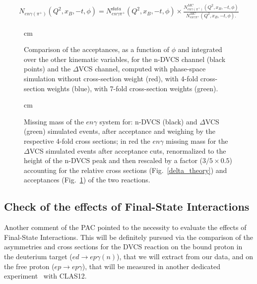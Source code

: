 \documentclass[12pt,oneside]{article}
\begin{document}
{\begin{eqnarray}\label{background_formula}
N_{en\gamma(\pi^+)}(Q^2,x_B,-t,\phi)=N^{data}_{en\gamma\pi^+}(Q^2,x_B,-t,\phi)\times \frac{N^{MC}_{en\gamma(\pi^+)}(Q^2,x_B,-t,\phi)}{N^{MC}_{en\gamma\pi^+}(Q^2,x_B,-t,\phi).}
\end{eqnarray}

\begin{figure}[h]  
\begin{center}
 cm
\caption{Comparison of the acceptances, as a function of $\phi$ and integrated over the other kinematic variables, for the n-DVCS channel (black points) and the $\Delta$VCS channel, computed with phase-space simulation without cross-section weight (red), with 4-fold cross-section weights (blue), with 7-fold cross-section weights (green).}
\label{acc_phi_delta}
\end{center}
\end{figure}

\begin{figure}[h]  
\begin{center}
 cm
\caption{Missing mass of the $en\gamma$ system for: n-DVCS (black) and $\Delta$VCS (green) simulated events, after acceptance and weighing by the respective 4-fold cross sections; in red the $en\gamma$ missing mass for the $\Delta$VCS simulated events after acceptance cuts, renormalized to the height of the n-DVCS peak and then rescaled by a factor ($3/5\times 0.5$) accounting for the relative cross sections (Fig.~\ref{delta_theory}) and acceptances (Fig.~\ref{acc_phi_delta}) of the two reactions.}
\label{delta_mm}
\end{center}
\end{figure}

\subsection{Check of the effects of Final-State Interactions}
Another comment of the PAC pointed to the necessity to evaluate the effects of Final-State Interactions. This will be definitely pursued via the comparison of the asymmetries and cross sections for the DVCS reaction on the bound proton in the deuterium target ($ed\to ep\gamma(n)$), that we will extract from our data, and on the free proton ($ep\to ep\gamma$), that will be measured in another dedicated experiment~\cite{sabatie} with CLAS12. 

}
\end{document}
